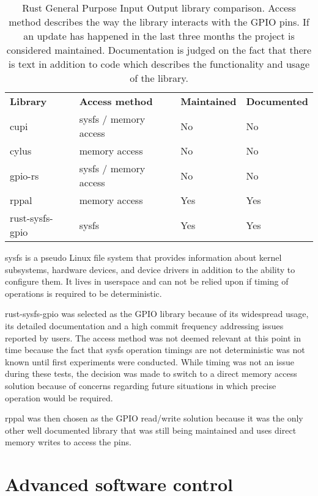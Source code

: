 \begin{table}[h]
\centering
\begin{tabular}{llll}
\textbf{Library} & \textbf{Access method} & \textbf{Maintained} & \textbf{Documented} \\
cupi             & sysfs / memory access  & No                  & No                  \\
cylus            & memory access          & No                  & No                  \\
gpio-rs          & sysfs / memory access  & No                  & No                  \\
rppal            & memory access          & Yes                 & Yes                 \\
rust-sysfs-gpio  & sysfs                  & Yes                 & Yes
\end{tabular}
\caption{Rust General Purpose Input Output library comparison. Access method describes the way the library interacts with the GPIO pins. If an update has happened in the last three months the project is considered maintained. Documentation is judged on the fact that there is text in addition to code which describes the functionality and usage of the library.}
\end{table}

sysfs is a pseudo Linux file system that provides information about kernel subsystems, hardware devices, and device drivers in addition to the ability to configure them. It lives in userspace and can not be relied upon if timing of operations is required to be deterministic. 

rust-sysfs-gpio \cite{rust-sysfs-gpio} was selected as the GPIO library because of its widespread usage, its detailed documentation and a high commit frequency addressing issues reported by users. The access method was not deemed relevant at this point in time because the fact that sysfs operation timings are not deterministic was not known until first experiments were conducted. While timing was not an issue during these tests, the decision was made to switch to a direct memory access solution because of concerns regarding future situations in which precise operation would be required. 

rppal \cite{rppal} was then chosen as the GPIO read/write solution because it was the only other well documented library that was still being maintained and uses direct memory writes to access the pins.


\section{Advanced software control}
